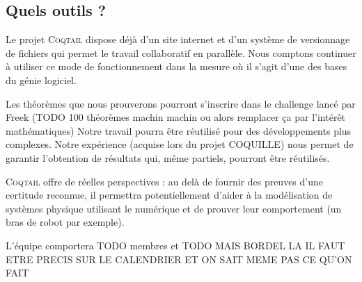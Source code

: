 \documentclass[11pt]{article}
\newcommand{\coqtail}{\textsc{Coqtail}}
\begin{document}
\subsection{Quels outils ?}


Le projet \coqtail{} dispose déjà d'un site internet\cite{coqtail} et d'un système de versionnage de fichiers qui permet le travail collaboratif en parallèle. Nous comptons continuer à utiliser ce mode de fonctionnement dans la mesure où il s'agit d'une des bases du génie logiciel.


Les théorèmes que nous prouverons pourront s'inscrire dans le challenge lancé par Freek (TODO 100 théorèmes machin machin ou alors remplacer ça par l'intérêt mathématiques) Notre travail pourra être réutilisé pour des développements plus complexes. Notre expérience (acquise lors du projet COQUILLE) nous permet de garantir l'obtention de résultats qui, même partiels, pourront être réutilisés.


\coqtail{} offre de réelles perspectives : au delà de fournir des preuves d'une certitude reconnue, %
il permettra potentiellement d'aider à la modélisation de systèmes physique utilisant le numérique et de prouver leur comportement (un bras de robot par exemple). %

L'équipe comportera TODO membres et TODO MAIS BORDEL LA IL FAUT ETRE PRECIS SUR LE CALENDRIER ET ON SAIT MEME PAS CE QU'ON FAIT

\printbibliography
\end{document}
